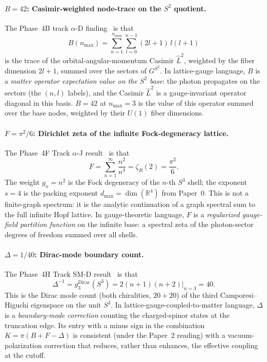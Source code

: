 \documentclass[aps,pra,twocolumn,superscriptaddress,longbibliography]{revtex4-2}
\begin{document}
\paragraph*{$B = 42$: Casimir-weighted node-trace on the $S^2$
quotient.}  The Phase~4B track $\alpha$-D finding~\cite{Paper2} is
that
\begin{equation}
B(n_{\max}) = \sum_{n=1}^{n_{\max}} \sum_{l=0}^{n-1}
  (2l+1)\,l(l+1)
\label{eq:B_casimir}
\end{equation}
is the trace of the orbital-angular-momentum Casimir $\hat{L}^2$,
weighted by the fiber dimension $2l+1$, summed over the sectors of
$G^{S^2}$.  In lattice-gauge language, $B$ is a \emph{matter
operator expectation value on the $S^2$ base}: the photon propagates
on the sectors (the $(n, l)$ labels), and the Casimir
$\hat{L}^2$ is a gauge-invariant operator diagonal in this basis.
$B = 42$ at $n_{\max} = 3$ is the value of this operator summed over
the base nodes, weighted by their $U(1)$ fiber dimensions.

\paragraph*{$F = \pi^2 / 6$: Dirichlet zeta of the infinite
Fock-degeneracy lattice.}  The Phase~4F Track $\alpha$-J
result~\cite{Paper2} is that
\begin{equation}
F = \sum_{n=1}^{\infty} \frac{n^2}{n^4}
  = \zeta_R(2) = \frac{\pi^2}{6}.
\label{eq:F_zeta}
\end{equation}
The weight $g_n = n^2$ is the Fock degeneracy of the $n$-th $S^3$
shell; the exponent $s = 4$ is the packing exponent
$d_{\max} = \dim(\mathbb{R}^4)$ from Paper~0.  This is not a
finite-graph spectrum: it is the analytic continuation of a graph
spectral sum to the full infinite Hopf lattice.  In gauge-theoretic
language, $F$ is a \emph{regularized gauge-field partition function}
on the infinite base: a spectral zeta of the photon-sector degrees
of freedom summed over all shells.

\paragraph*{$\Delta = 1/40$: Dirac-mode boundary count.} The Phase~4H
Track SM-D result~\cite{Paper2} is that
\begin{equation}
\Delta^{-1} = g_3^{\mathrm{Dirac}}(S^3)
  = 2(n+1)(n+2)\bigg|_{n=3} = 40.
\label{eq:Delta_dirac}
\end{equation}
This is the Dirac mode count (both chiralities, $20 + 20$) of the third
Camporesi--Higuchi eigenspace on the unit $S^3$.  In
lattice-gauge-coupled-to-matter language, $\Delta$ is a
\emph{boundary-mode correction} counting the charged-spinor states at
the truncation edge.  Its entry with a minus sign in the combination
$K = \pi(B + F - \Delta)$ is consistent (under the Paper~2 reading)
with a vacuum-polarization correction that reduces, rather than
enhances, the effective coupling at the cutoff.
\end{document}
